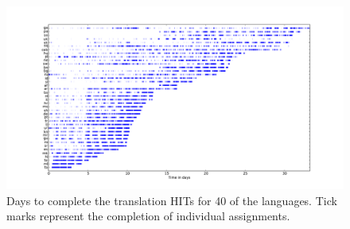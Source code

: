 \documentclass[11pt]{article}
\begin{document}
\begin{figure}[h]
\includegraphics[height=\linewidth,angle=270]{../final-figures/completetime}
\caption{Days to complete the translation HITs for 40 of the languages. Tick marks represent the completion of individual assignments. }
\label{completion-time}
\end{figure}
\end{document}
